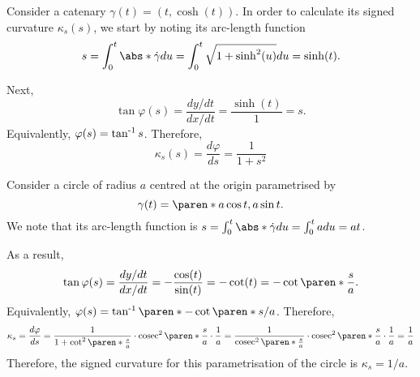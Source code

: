 \documentclass[11pt]{penrose}
\begin{document}
\begin{negg}
    Consider a catenary $\gamma(t) = (t, \cosh(t))$. In order to calculate its signed curvature $\kappa_s(s)$, we start by noting its arc-length function
    \begin{equation}
        s = \int_0^t \abs*{\dot{\gamma}} du
        = \int_0^t \sqrt{1 + \sinh^2(u)} du
        = \sinh(t).
    \end{equation}

    Next,
    \begin{equation}
        \tan\varphi(s) = \frac{dy/dt}{dx/dt}
        = \frac{\sinh(t)}{1} = s.
    \end{equation}
    Equivalently, $\varphi(s) = \operatorname{{tan}^{-1}}{s}$. Therefore,
    \begin{equation}
        \kappa_s(s) = \frac{d\varphi}{ds} = \frac{1}{1+s^2}
    \end{equation}
\end{negg}

\begin{negg}
    Consider a circle of radius $a$ centred at the origin parametrised by
    \begin{equation}
        \gamma(t) = \paren*{a \cos t, a \sin t}.
    \end{equation}
    We note that its arc-length function is $s = \int_0^t \abs*{\dot{\gamma}} du = \int_0^t a du = at$.

    As a result,
    \begin{equation}
        \tan\varphi(s) = \frac{dy/dt}{dx/dt} = -\frac{\cos(t)}{\sin(t)} = -\cot(t) = -\cot\paren*{\frac{s}{a}}.
    \end{equation}
    Equivalently, $\varphi(s) = \atan{ \paren*{-\cot\paren*{s/a}} }$. Therefore,
    \begin{align}
        \kappa_s
        = \frac{d\varphi}{ds}
        = \frac{1}{1+\cot^2\paren*{ \frac{s}{a} }} \cdot \cosec^2\paren*{ \frac{s}{a} } \cdot \frac{1}{a}
        = \frac{1}{\cosec^2\paren*{ \frac{s}{a} }} \cdot \cosec^2\paren*{ \frac{s}{a} } \cdot \frac{1}{a}
        = \frac{1}{a}
    \end{align}
    Therefore, the signed curvature for this parametrisation of the circle is $\kappa_s = 1/a$.
\end{negg}

\end{document}
